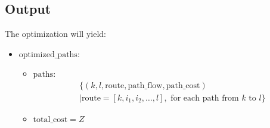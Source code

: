 \documentclass{article}
\begin{document}
\subsection*{Output}
The optimization will yield:
\begin{itemize}
    \item \( \text{optimized\_paths} \):
    \begin{itemize}
        \item \( \text{paths} \):
        \[
        \begin{aligned}
            &\{ (k, l, \text{route}, \text{path\_flow}, \text{path\_cost}) \\
            &| \text{route} = [k, i_1, i_2, \ldots, l], \text{ for each path from } k \text{ to } l \}
        \end{aligned}
        \]
        \item \( \text{total\_cost} = Z \)
    \end{itemize}
\end{itemize}
\end{document}

